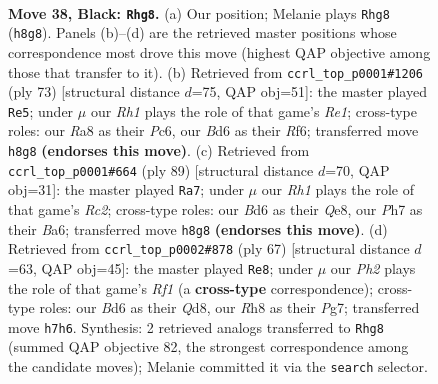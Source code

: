 \documentclass[11pt]{article}
\begin{document}
\clearpage

\begin{figure}[p]\centering
\begin{subfigure}{0.46\textwidth}\centering
\resizebox{\linewidth}{!}{%
\newchessgame
\chessboard[
  setfen={r6r/p2k2pp/3b4/n2p2Q1/p2P2PP/4P2K/1q1N4/3R4 b - - 9 38},
  showmover=false,
  pgfstyle=straightmove, color=movearrow, markmove={h8-g8}
]}
\caption{}
\end{subfigure}\hfill
\begin{subfigure}{0.46\textwidth}\centering
\resizebox{\linewidth}{!}{%
\newchessgame
\chessboard[
  setfen={4r3/1p4k1/p1p2r2/P5n1/1Q2p1b1/2P5/1PBR1PK1/8 b - - 5 37},
  showmover=false,
  pgfstyle=straightmove, color=movearrow, markmove={e8-e5}
]}
\caption{}
\end{subfigure}
\\[4pt]
\begin{subfigure}{0.46\textwidth}\centering
\resizebox{\linewidth}{!}{%
\newchessgame
\chessboard[
  setfen={4q3/2r4k/br5p/4p3/1p2P3/1P3PQ1/NKPR4/6R1 b - - 3 45},
  showmover=false,
  pgfstyle=straightmove, color=movearrow, markmove={c7-a7}
]}
\caption{}
\end{subfigure}\hfill
\begin{subfigure}{0.46\textwidth}\centering
\resizebox{\linewidth}{!}{%
\newchessgame
\chessboard[
  setfen={3q1r1k/5pp1/pp5p/8/P4Q1P/1P6/5PP1/4R1K1 b - - 0 34},
  showmover=false,
  pgfstyle=straightmove, color=movearrow, markmove={f8-e8}
]}
\caption{}
\end{subfigure}
\caption{\textbf{Move 38, Black: \texttt{Rhg8}.} (a) Our position; Melanie plays \texttt{Rhg8} (\texttt{h8g8}). Panels (b)--(d) are the retrieved master positions whose correspondence most drove this move (highest QAP objective among those that transfer to it). (b) Retrieved from \texttt{ccrl\_top\_p0001\#1206} (ply 73) [structural distance $d$=75, QAP obj=51]: the master played \texttt{Re5}; under $\mu$ our \emph{Rh1} plays the role of that game's \emph{Re1}; cross-type roles: our \emph{R}a8 as their \emph{P}c6, our \emph{B}d6 as their \emph{R}f6; transferred move \texttt{h8g8} \textbf{(endorses this move)}. (c) Retrieved from \texttt{ccrl\_top\_p0001\#664} (ply 89) [structural distance $d$=70, QAP obj=31]: the master played \texttt{Ra7}; under $\mu$ our \emph{Rh1} plays the role of that game's \emph{Rc2}; cross-type roles: our \emph{B}d6 as their \emph{Q}e8, our \emph{P}h7 as their \emph{B}a6; transferred move \texttt{h8g8} \textbf{(endorses this move)}. (d) Retrieved from \texttt{ccrl\_top\_p0002\#878} (ply 67) [structural distance $d$=63, QAP obj=45]: the master played \texttt{Re8}; under $\mu$ our \emph{Ph2} plays the role of that game's \emph{Rf1} (a \textbf{cross-type} correspondence); cross-type roles: our \emph{B}d6 as their \emph{Q}d8, our \emph{R}h8 as their \emph{P}g7; transferred move \texttt{h7h6}. Synthesis: 2 retrieved analogs transferred to \texttt{Rhg8} (summed QAP objective 82, the strongest correspondence among the candidate moves); Melanie committed it via the \texttt{search} selector.}
\label{fig:thought-m75}
\end{figure}
\end{document}
